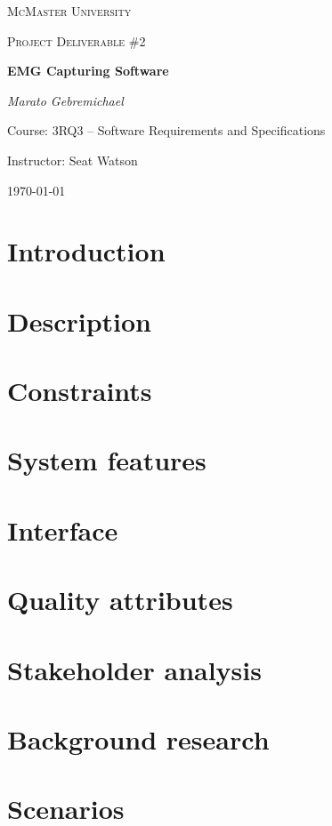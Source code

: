 \documentclass[12pt,a4paper]{article}
\begin{document}
\begin{titlepage}
	\centering
	{\scshape\LARGE McMaster University \par}
	\vspace{2cm}
	{\scshape\Large Project Deliverable \#2 \par}
	\vspace{4cm}
	{\huge\bfseries EMG Capturing Software\par}
	\vspace{2cm}
	{\Large\itshape Marato Gebremichael\par}
	
	\vfill
	Course: 3RQ3 – Software Requirements and Specifications\par
    Instructor: Seat Watson

	\vfill

	{\large \today\par}
\end{titlepage}

\tableofcontents

\newpage

\section{Introduction}

\section{Description}

\section{Constraints}

\section{System features}

\section{Interface}

\section{Quality attributes}

\section{Stakeholder analysis}

\section{Background research}

\section{Scenarios}
\end{document}
